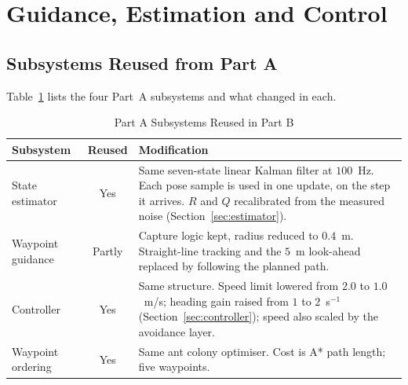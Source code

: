 \section{Guidance, Estimation and Control}
\label{sec:guidance}

\subsection{Subsystems Reused from Part A}
Table~\ref{tab:reuse} lists the four Part~A subsystems and what changed
in each.

\begin{table}[!t]
    \centering
    \caption{Part A Subsystems Reused in Part B}
    \label{tab:reuse}
    \footnotesize
    \begin{tabularx}{\linewidth}{@{}l c >{\raggedright\arraybackslash}X@{}}
        \toprule
        \textbf{Subsystem} & \textbf{Reused} & \textbf{Modification} \\
        \midrule
        State estimator   & Yes    & Same seven-state linear Kalman filter at $100$~Hz. Each pose sample is used in one update, on the step it arrives. $R$ and $Q$ recalibrated from the measured noise (Section~\ref{sec:estimator}). \\
        Waypoint guidance & Partly & Capture logic kept, radius reduced to $0.4$~m. Straight-line tracking and the $5$~m look-ahead replaced by following the planned path. \\
        Controller        & Yes    & Same structure. Speed limit lowered from $2.0$ to $1.0$~m/s; heading gain raised from $1$ to $2$~s$^{-1}$ (Section~\ref{sec:controller}); speed also scaled by the avoidance layer. \\
        Waypoint ordering & Yes    & Same ant colony optimiser. Cost is A* path length; five waypoints. \\
        \bottomrule
    \end{tabularx}
\end{table}


